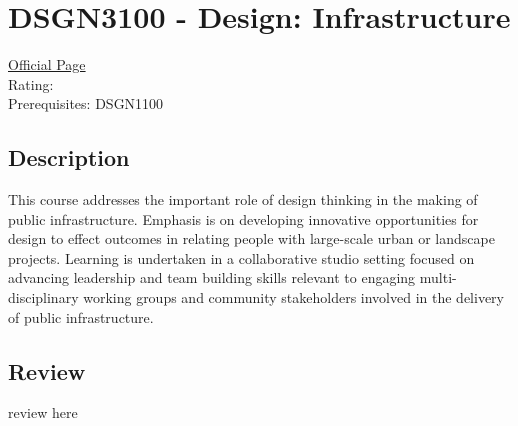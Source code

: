 \hypertarget{DSGN3100}{\section{DSGN3100 - Design: Infrastructure}}

\large
\textcolor{turbo_purple}{\href{https://my.uq.edu.au/programs-courses/course.html?course_code=DSGN3100}{Official Page}} \\
Rating: \cstar\cstar\cstar\cstar\ostar \\
Prerequisites: DSGN1100

\normalsize
\subsection*{Description}
This course addresses the important role of design thinking in the making of public infrastructure.
Emphasis is on developing innovative opportunities for design to effect outcomes in relating people with large-scale urban or landscape projects.
Learning is undertaken in a collaborative studio setting focused on advancing leadership and team building skills relevant to engaging multi-disciplinary working groups and community stakeholders involved in the delivery of public infrastructure.

\subsection*{Review}
review here
